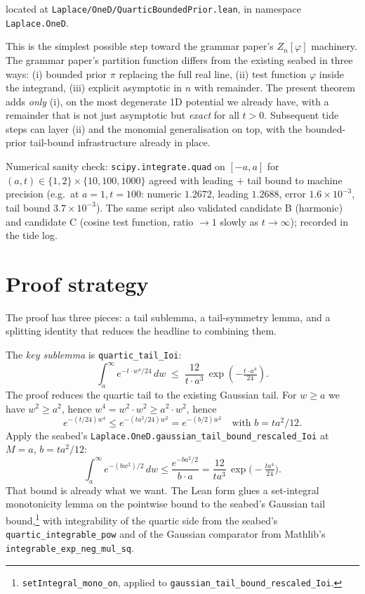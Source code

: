 \documentclass[11pt]{article}
\begin{document}
\noindent located at \texttt{Laplace/OneD/QuarticBoundedPrior.lean}, in
namespace \texttt{Laplace.OneD}.

This is the simplest possible step toward the grammar paper's
$Z_n[\varphi]$ machinery. The grammar paper's partition function differs
from the existing seabed in three ways: (i) bounded prior $\pi$ replacing
the full real line, (ii) test function $\varphi$ inside the integrand,
(iii) explicit asymptotic in $n$ with remainder. The present theorem
adds \emph{only} (i), on the most degenerate 1D potential we already
have, with a remainder that is not just asymptotic but \emph{exact} for
all $t > 0$. Subsequent tide steps can layer (ii) and the monomial
generalisation on top, with the bounded-prior tail-bound infrastructure
already in place.

Numerical sanity check: \texttt{scipy.integrate.quad} on $[-a,a]$ for
$(a,t) \in \{1,2\} \times \{10, 100, 1000\}$ agreed with leading
$+$ tail bound to machine precision (e.g.\ at $a=1, t=100$:
numeric $1.2672$, leading $1.2688$, error $1.6\times 10^{-3}$, tail
bound $3.7\times 10^{-3}$). The same script also validated candidate B
(harmonic) and candidate C (cosine test function, ratio $\to 1$ slowly
as $t\to\infty$); recorded in the tide log.

\section{Proof strategy}

The proof has three pieces: a tail sublemma, a tail-symmetry lemma, and a
splitting identity that reduces the headline to combining them.

The \emph{key sublemma} is \texttt{quartic\_tail\_Ioi}:
\[
  \int_a^\infty e^{-t \cdot w^4/24}\, dw
  \;\le\; \frac{12}{t \cdot a^3}\,\exp\!\left(-\tfrac{t \cdot a^4}{24}\right).
\]
The proof reduces the quartic tail to the existing Gaussian tail. For
$w \ge a$ we have $w^2 \ge a^2$, hence $w^4 = w^2 \cdot w^2 \ge a^2 \cdot
w^2$, hence
\[
  e^{-(t/24) w^4} \le e^{-(t a^2/24) w^2}
  = e^{-(b/2) w^2} \quad\text{with } b = t a^2/12.
\]
Apply the seabed's \texttt{Laplace.OneD.gaussian\_tail\_bound\_rescaled\_Ioi}
at $M = a$, $b = t a^2/12$:
\[
  \int_a^\infty e^{-(b w^2)/2}\, dw \le \frac{e^{-b a^2 / 2}}{b \cdot a}
  = \frac{12}{t a^3}\,\exp\!\big(-\tfrac{t a^4}{24}\big).
\]
That bound is already what we want. The Lean form glues a set-integral
monotonicity lemma on the pointwise bound to the seabed's Gaussian tail
bound,\footnote{\texttt{setIntegral\_mono\_on}, applied to
\texttt{gaussian\_tail\_bound\_rescaled\_Ioi}.} with integrability of
the quartic side from the seabed's \texttt{quartic\_integrable\_pow}
and of the Gaussian comparator from Mathlib's
\texttt{integrable\_exp\_neg\_mul\_sq}.
\end{document}
